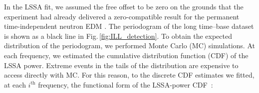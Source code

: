 In the LSSA fit, we assumed the free offset to be zero on the grounds that the experiment had already delivered a zero-compatible result for the permanent time-independent neutron EDM \cite{Baker2006, *Baker2006B,Pendlebury2015}. The periodogram of the long time--base dataset is shown as a black line in Fig.\,\ref{fig:ILL_detection}.
To obtain the expected distribution of the periodogram, we performed Monte Carlo (MC) simulations. At each frequency, we estimated the cumulative distribution function (CDF) of the LSSA power. Extreme events in the tails of the distribution are expensive to access directly with MC. For this reason, to the discrete CDF estimates we fitted, at each $i^\textrm{th}$ frequency, the functional form of the LSSA-power CDF~\cite{Scargle1982}:
